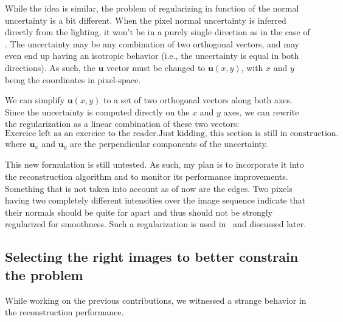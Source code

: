 While the idea is similar, the problem of regularizing in function of the normal uncertainty is a bit different. When the pixel normal uncertainty is inferred directly from the lighting, it won't be in a purely single direction as in the case of \cite{hernandez-pami-11}. The uncertainty may be any combination of two orthogonal vectors, and may even end up having an isotropic behavior (i.e., the uncertainty is equal in both directions). As such, the $\mathbf{u}$ vector must be changed to $\mathbf{u}(x,y)$, with $x$ and $y$ being the coordinates in pixel-space.

We can simplify $\mathbf{u}(x,y)$ to a set of two orthogonal vectors along both axes. Since the uncertainty is computed directly on the $x$ and $y$ axes, we can rewrite the regularization as a linear combination of these two vectors:
\begin{equation}
\text{Exercice left as an exercice to the reader.}

\text{Just kidding, this section is still in construction.}

\end{equation}
where $\mathbf{u}_x$ and $\mathbf{u}_y$ are the perpendicular components of the uncertainty.

This new formulation is still untested. As such, my plan is to incorporate it into the reconstruction algorithm and to monitor its performance improvements. Something that is not taken into account as of now are the edges. Two pixels having two completely different intensities over the image sequence indicate that their normals should be quite far apart and thus should not be strongly regularized for smoothness. Such a regularization is used in~\cite{jung-cvpr-15} and discussed later.


\subsection{Selecting the right images to better constrain the problem}
While working on the previous contributions, we witnessed a strange behavior in the reconstruction performance.

